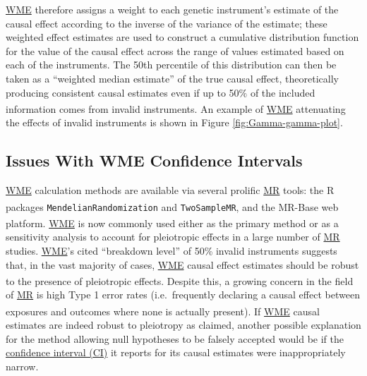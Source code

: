 \documentclass[
]{article}
\begin{document}
\hyperref[acronyms_WME]{WME} therefore assigns a weight to each genetic instrument's estimate of the causal effect according to the inverse of the variance of the estimate; these weighted effect estimates are used to construct a cumulative distribution function for the value of the causal effect across the range of values estimated based on each of the instruments. The 50th percentile of this distribution can then be taken as a ``weighted median estimate'' of the true causal effect, theoretically producing consistent causal estimates even if up to 50\% of the included information comes from invalid instruments\textsuperscript{}. An example of \hyperref[acronyms_WME]{WME} attenuating the effects of invalid instruments is shown in Figure \ref{fig:Gamma-gamma-plot}.

\subsection{Issues With WME Confidence Intervals}\label{issues-with-wme-confidence-intervals}

\hyperref[acronyms_WME]{WME} calculation methods are available via several prolific \hyperref[acronyms_MR]{MR} tools: the R packages \texttt{MendelianRandomization}\textsuperscript{} and \texttt{TwoSampleMR}, and the MR-Base web platform\textsuperscript{}. \hyperref[acronyms_WME]{WME} is now commonly used either as the primary method or as a sensitivity analysis to account for pleiotropic effects in a large number of \hyperref[acronyms_MR]{MR} studies. \hyperref[acronyms_WME]{WME}'s cited ``breakdown level'' of 50\% invalid instruments suggests that, in the vast majority of cases, \hyperref[acronyms_WME]{WME} causal effect estimates should be robust to the presence of pleiotropic effects\textsuperscript{}. Despite this, a growing concern in the field of \hyperref[acronyms_MR]{MR} is high Type 1 error rates (i.e.~frequently declaring a causal effect between exposures and outcomes where none is actually present)\textsuperscript{}. If \hyperref[acronyms_WME]{WME} causal estimates are indeed robust to pleiotropy as claimed, another possible explanation for the method allowing null hypotheses to be falsely accepted would be if the \hyperref[acronyms_CI]{confidence interval (CI)} it reports for its causal estimates were inappropriately narrow.
\end{document}
